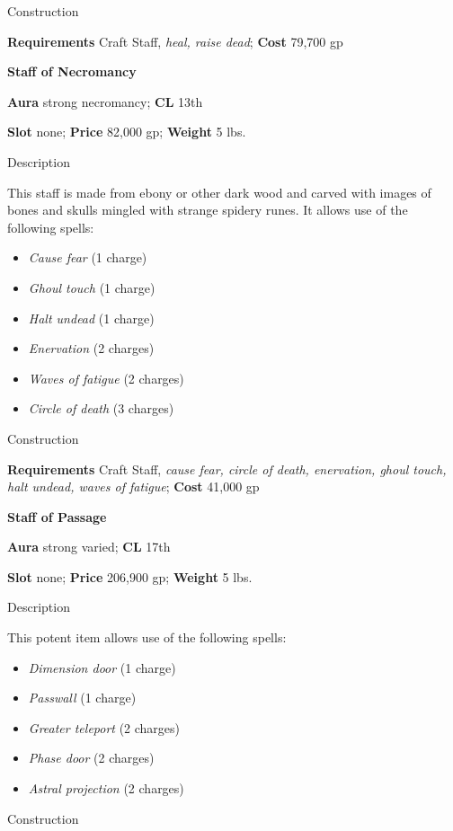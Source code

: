 Construction
				
\textbf{Requirements} Craft Staff, \textit{heal, raise dead}; \textbf{Cost }79,700 gp
				
\textbf{Staff of Necromancy}
				
\textbf{Aura} strong necromancy; \textbf{CL} 13th
				
\textbf{Slot} none; \textbf{Price} 82,000 gp; \textbf{Weight} 5 lbs.
				
Description
				
This staff is made from ebony or other dark wood and carved with images of bones and skulls mingled with strange spidery runes. It allows use of the following spells:
				\begin{itemize}\item  \textit{Cause fear} (1 charge)
				\item  \textit{Ghoul touch} (1 charge)
				\item  \textit{Halt undead} (1 charge)
				\item  \textit{Enervation} (2 charges)
				\item  \textit{Waves of fatigue} (2 charges)
				\item  \textit{Circle of death} (3 charges) 
\end{itemize}
				
Construction
				
\textbf{Requirements} Craft Staff, \textit{cause fear, circle of death, enervation, ghoul touch, halt undead, waves of fatigue}; \textbf{Cost }41,000 gp
				
\textbf{Staff of Passage}
				
\textbf{Aura} strong varied;\textbf{ CL }17th
				
\textbf{Slot} none; \textbf{Price} 206,900 gp; \textbf{Weight} 5 lbs.
				
Description
				
This potent item allows use of the following spells: 
				\begin{itemize}\item  \textit{Dimension door} (1 charge)
				\item  \textit{Passwall} (1 charge)
				\item  \textit{Greater teleport} (2 charges)
				\item  \textit{Phase door} (2 charges)
				\item  \textit{Astral projection} (2 charges) 
\end{itemize}
				
Construction
				
